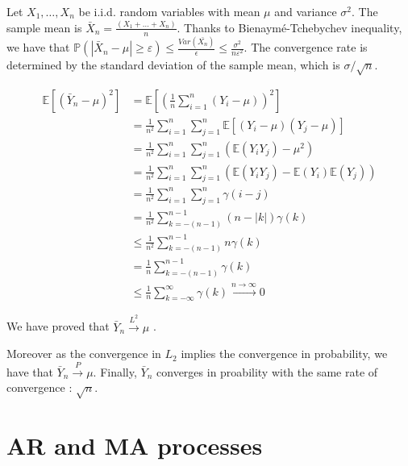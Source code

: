 \documentclass[11pt]{article}
\begin{document}
\begin{solution}  %

    Let $X_1, \dots, X_n$ be i.i.d. random variables with mean $\mu$ and variance $\sigma^2$. The sample mean  is $\bar{X}_n = \frac{(X_1+\dots+X_n)}{n}$. 
    Thanks to Bienaymé-Tchebychev inequality, we have that $\mathbb{P} (|\bar{X}_n - \mu| \geq \varepsilon) \leq  \frac{Var(\bar{X_n})}{\epsilon} \leq \frac{\sigma^2}{n\varepsilon^2}$.
    The convergence rate is determined by the standard deviation of the sample mean, which is $\sigma/\sqrt{n}$.

    \begin{align}
        \mathbb{E}[(\bar{Y}_n-\mu)^2] &= \mathbb{E}[(\frac{1}{n} \sum_{i=1}^n( Y_i - \mu))^2] \\
        &= \frac{1}{n^2} \sum_{i=1}^n \sum_{j=1}^n \mathbb{E}[(Y_i-\mu)(Y_j-\mu)] \\
        &= \frac{1}{n^2} \sum_{i=1}^n \sum_{j=1}^n (\mathbb{E}(Y_i Y_j) -\mu^2) \\
        &= \frac{1}{n^2} \sum_{i=1}^n \sum_{j=1}^n (\mathbb{E}(Y_i Y_j) -\mathbb{E}(Y_i) \mathbb{E}(Y_j)) \\
        &= \frac{1}{n^2} \sum_{i=1}^n \sum_{j=1}^n \gamma(i-j) \\
        &= \frac{1}{n^2} \sum_{k=-(n-1)}^{n-1} (n-|k|) \gamma(k) \\
        &\leq \frac{1}{n^2} \sum_{k=-(n-1)}^{n-1} n \gamma(k) \\
        &= \frac{1}{n} \sum_{k=-(n-1)}^{n-1} \gamma(k) \\
        &\leq \frac{1}{n} \sum_{k=-\infty}^{\infty} \gamma(k) \xrightarrow{n \to \infty} 0
    \end{align}

We have proved that $\bar{Y}_n \xrightarrow{L^2} \mu $ .

Moreover as  the convergence in $L_2$ implies the convergence in probability, we have that $\bar{Y}_n \xrightarrow{P} \mu $.
Finally, $\bar{Y}_n$ converges in proability with the same rate of convergence : $\sqrt{n}$.
\end{solution}


\newpage
\section{AR and MA processes}
\end{document}
